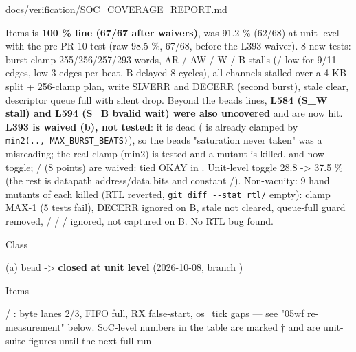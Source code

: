 \begin{relocated}{docs/verification/SOC_COVERAGE_REPORT.md}
\begin{rowtable}
\begin{rowcell}{Items}
 is \textbf{100 \% line (67/67 after waivers)}, was
91.2 \% (62/68) at unit level with the pre-PR 10-test 
(raw 98.5 \%, 67/68, before the L393 waiver). 8 new tests: burst clamp
255/\allowbreak{}256/\allowbreak{}257/\allowbreak{}293 words, AR / AW /
W / B stalls (/ low for 9/11 edges,
 low 3 edges per beat, B delayed 8 cycles), all channels
stalled over a 4 KB-split + 256-clamp plan, write SLVERR and DECERR
(second burst), stale  clear, descriptor queue full
with silent drop. Beyond the bead\textquotesingle s lines, \textbf{L584
(S\_W  stall) and L594 (S\_B bvalid wait) were also
uncovered} and are now hit. \textbf{L393 is waived (b), not tested}: it
is dead ( is already clamped by
\texttt{min2(.\allowbreak{}.\allowbreak{},\allowbreak{}\ MAX\_\allowbreak{}BURST\_\allowbreak{}BEATS)}),
so the bead\textquotesingle s "saturation never taken" was a misreading;
the real clamp (min2) is tested and a  mutant is killed.
 and  now toggle;
/ (8 points) are waived: tied OKAY
in . Unit-level toggle 28.8 -\textgreater{}
37.5 \% (the rest is datapath address/\allowbreak{}data bits and
constant /). Non-vacuity: 9 hand mutants
of  each killed (RTL reverted,
\texttt{git\ diff\ -\allowbreak{}-\allowbreak{}stat\ rtl/\allowbreak{}}
empty): clamp MAX-1 (5 tests fail), DECERR ignored on B, stale
 not cleared, queue-full guard removed, 
/  /  /  ignored,
 not captured on B. No RTL bug found.

\end{rowcell}


\begin{rowcell}{Class}

(a) bead  -\textgreater{} \textbf{closed at unit level}
(2026-10-08, branch )

\end{rowcell}

\begin{rowcell}{Items}

 / : byte lanes 2/3, FIFO
full, RX false-start, os\_tick gaps --- see "05wf re-measurement" below.
SoC-level numbers in the table are marked † and are unit-suite figures
until the next full  run


\end{rowcell}
\end{rowtable}
\end{relocated}
